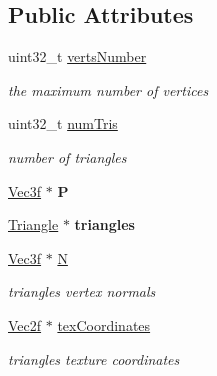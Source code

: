 \subsection*{Public Attributes}
\begin{DoxyCompactItemize}
\item 
uint32\+\_\+t \hyperlink{class_mesh_a77cc0257fcf6e780b4d286a97e94ec3c}{verts\+Number}\hypertarget{class_mesh_a77cc0257fcf6e780b4d286a97e94ec3c}{}\label{class_mesh_a77cc0257fcf6e780b4d286a97e94ec3c}

\begin{DoxyCompactList}\small\item\em the maximum number of vertices \end{DoxyCompactList}\item 
uint32\+\_\+t \hyperlink{class_mesh_a6cf23eafd1fca3375dcd7ed805f32340}{num\+Tris}\hypertarget{class_mesh_a6cf23eafd1fca3375dcd7ed805f32340}{}\label{class_mesh_a6cf23eafd1fca3375dcd7ed805f32340}

\begin{DoxyCompactList}\small\item\em number of triangles \end{DoxyCompactList}\item 
\hyperlink{class_vec3}{Vec3f} $\ast$ {\bfseries P}\hypertarget{class_mesh_a977d73ff3b08961c0c7fea25897422d6}{}\label{class_mesh_a977d73ff3b08961c0c7fea25897422d6}

\item 
\hyperlink{class_triangle}{Triangle} $\ast$ {\bfseries triangles}\hypertarget{class_mesh_acfbc65d1fea728464f102eac4e6def71}{}\label{class_mesh_acfbc65d1fea728464f102eac4e6def71}

\item 
\hyperlink{class_vec3}{Vec3f} $\ast$ \hyperlink{class_mesh_a3f10793cd173995a7042acf97955984f}{N}\hypertarget{class_mesh_a3f10793cd173995a7042acf97955984f}{}\label{class_mesh_a3f10793cd173995a7042acf97955984f}

\begin{DoxyCompactList}\small\item\em triangles vertex normals \end{DoxyCompactList}\item 
\hyperlink{class_vec2}{Vec2f} $\ast$ \hyperlink{class_mesh_afa65cdda90551fad18f51c044e9a9b5e}{tex\+Coordinates}\hypertarget{class_mesh_afa65cdda90551fad18f51c044e9a9b5e}{}\label{class_mesh_afa65cdda90551fad18f51c044e9a9b5e}

\begin{DoxyCompactList}\small\item\em triangles texture coordinates \end{DoxyCompactList}\end{DoxyCompactItemize}


